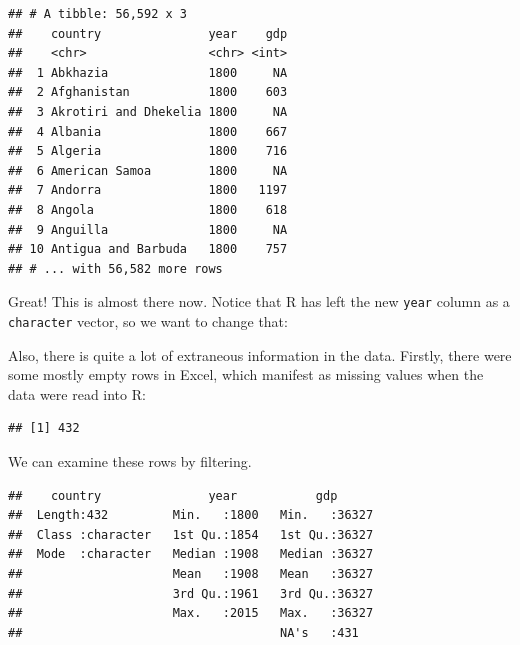 \documentclass[]{book}
\newenvironment{Shaded}{\begin{snugshade}}{\end{snugshade}}
\newcommand{\KeywordTok}[1]{\textcolor[rgb]{0.13,0.29,0.53}{\textbf{{#1}}}}
\newcommand{\DataTypeTok}[1]{\textcolor[rgb]{0.13,0.29,0.53}{{#1}}}
\newcommand{\StringTok}[1]{\textcolor[rgb]{0.31,0.60,0.02}{{#1}}}
\newcommand{\NormalTok}[1]{{#1}}
\theoremstyle{definition}
\theoremstyle{definition}
\theoremstyle{definition}
\theoremstyle{remark}
\begin{document}
\begin{verbatim}
## # A tibble: 56,592 x 3
##    country               year    gdp
##    <chr>                 <chr> <int>
##  1 Abkhazia              1800     NA
##  2 Afghanistan           1800    603
##  3 Akrotiri and Dhekelia 1800     NA
##  4 Albania               1800    667
##  5 Algeria               1800    716
##  6 American Samoa        1800     NA
##  7 Andorra               1800   1197
##  8 Angola                1800    618
##  9 Anguilla              1800     NA
## 10 Antigua and Barbuda   1800    757
## # ... with 56,582 more rows
\end{verbatim}

Great! This is almost there now. Notice that R has left the new
\texttt{year} column as a \texttt{character} vector, so we want to
change that:

\begin{Shaded}
\end{Shaded}

Also, there is quite a lot of extraneous information in the data.
Firstly, there were some mostly empty rows in Excel, which manifest as
missing values when the data were read into R:

\begin{Shaded}
\end{Shaded}

\begin{verbatim}
## [1] 432
\end{verbatim}

We can examine these rows by filtering.

\begin{Shaded}
\end{Shaded}

\begin{verbatim}
##    country               year           gdp       
##  Length:432         Min.   :1800   Min.   :36327  
##  Class :character   1st Qu.:1854   1st Qu.:36327  
##  Mode  :character   Median :1908   Median :36327  
##                     Mean   :1908   Mean   :36327  
##                     3rd Qu.:1961   3rd Qu.:36327  
##                     Max.   :2015   Max.   :36327  
##                                    NA's   :431
\end{verbatim}
\end{document}
